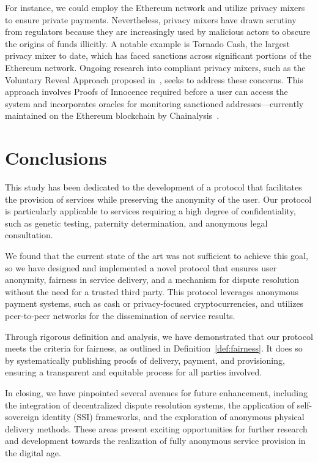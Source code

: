 \documentclass[pdftex,twocolumn,epjc3]{svjour3}
\begin{document}
\begin{sloppypar}
For instance, we could employ the Ethereum network and utilize privacy mixers to ensure private payments. Nevertheless, privacy mixers have drawn scrutiny from regulators because they are increasingly used by malicious actors to obscure the origins of funds illicitly. A notable example is Tornado Cash, the largest privacy mixer to date, which has faced sanctions across significant portions of the Ethereum network. Ongoing research into compliant privacy mixers, such as the Voluntary Reveal Approach proposed in~\cite{dotanHazeCompliantPrivacy2023}, seeks to address these concerns. This approach involves Proofs of Innocence required before a user can access the system and incorporates oracles for monitoring sanctioned addresses—currently maintained on the Ethereum blockchain by Chainalysis~\cite{ChainalysisOracleSanctions}.
\end{sloppypar}

\section{Conclusions}\label{sec:conclusion}

This study has been dedicated to the development of a protocol that facilitates the provision of services while preserving the anonymity of the user. Our protocol is particularly applicable to services requiring a high degree of confidentiality, such as genetic testing, paternity determination, and anonymous legal consultation.

We found that the current state of the art was not sufficient to achieve this goal, so we have designed and implemented a novel protocol that ensures user anonymity, fairness in service delivery, and a mechanism for dispute resolution without the need for a trusted third party. This protocol leverages anonymous payment systems, such as cash or privacy-focused cryptocurrencies, and utilizes peer-to-peer networks for the dissemination of service results.

\begin{sloppypar}
Through rigorous definition and analysis, we have demonstrated that our protocol meets the criteria for fairness, as outlined in Definition~\ref{def:fairness}. It does so by systematically publishing proofs of delivery, payment, and provisioning, ensuring a transparent and equitable process for all parties involved.
\end{sloppypar}

In closing, we have pinpointed several avenues for future enhancement, including the integration of decentralized dispute resolution systems, the application of self-sovereign identity (SSI) frameworks, and the exploration of anonymous physical delivery methods. These areas present exciting opportunities for further research and development towards the realization of fully anonymous service provision in the digital age.
\end{document}
